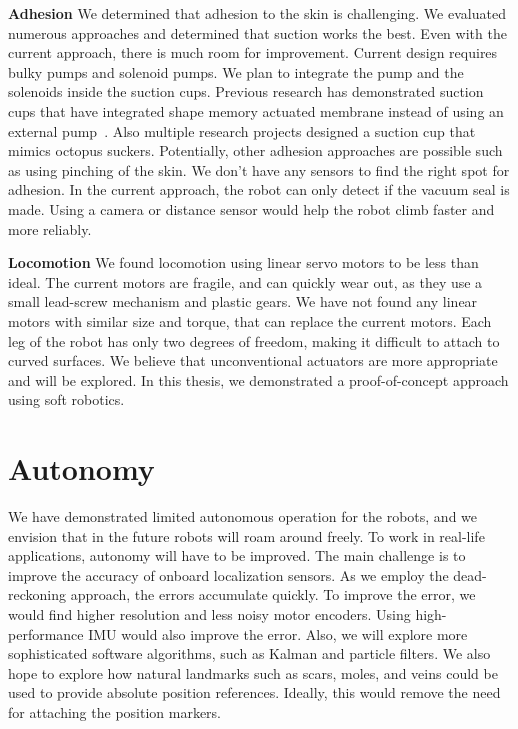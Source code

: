 \textbf{Adhesion} 
We determined that adhesion to the skin is challenging. We evaluated numerous approaches and determined that suction works the best. Even with the current approach, there is much room for improvement. Current design requires bulky pumps and solenoid pumps. We plan to integrate the pump and the solenoids inside the suction cups. Previous research has demonstrated suction cups that have integrated shape memory actuated membrane instead of using an external pump~\cite{bing2009bio}. Also multiple research projects designed a suction cup that mimics octopus suckers\cite{tramacere2012artificial,tramacere2015octopus,sareh2017anchoring}. Potentially, other adhesion approaches are possible such as using pinching of the skin. 
We don't have any sensors to find the right spot for adhesion. In the current approach, the robot can only detect if the vacuum seal is made. Using a camera or distance sensor would help the robot climb faster and more reliably. 


\textbf{Locomotion}
We found locomotion using linear servo motors to be less than ideal. The current motors are fragile, and can quickly wear out, as they use a small lead-screw mechanism and plastic gears. We have not found any linear motors with similar size and torque, that can replace the current motors. Each leg of the robot has only two degrees of freedom, making it difficult to attach to curved surfaces. We believe that unconventional actuators are more appropriate and will be explored. In this thesis, we demonstrated a proof-of-concept approach using soft robotics. 

\section{Autonomy}
We have demonstrated limited autonomous operation for the robots, and we envision that in the future robots will roam around freely. To work in real-life applications, autonomy will have to be improved. The main challenge is to improve the accuracy of onboard localization sensors. As we employ the dead-reckoning approach, the errors accumulate quickly. To improve the error, we would find higher resolution and less noisy motor encoders. Using high-performance IMU would also improve the error. Also, we will explore more sophisticated software algorithms, such as Kalman and particle filters. We also hope to explore how natural landmarks such as scars, moles, and veins could be used to provide absolute position references. Ideally, this would remove the need for attaching the position markers. 

